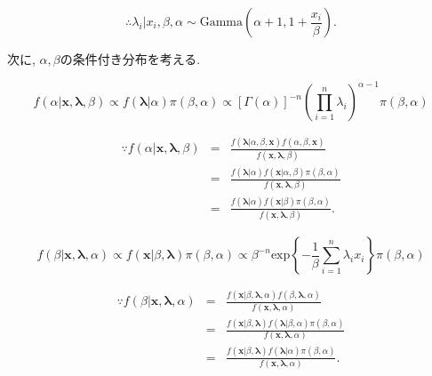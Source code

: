 \documentclass[12pt,dvipdfmx]{beamer}
\begin{document}
\begin{frame}


$$
\therefore
\lambda _{i}|x_{i},\beta ,\alpha 
\sim 
\mbox{Gamma} \left(\alpha +1,1+\frac{x_{i}}{\beta }\right).
$$

次に, $\alpha, \beta$の条件付き分布を考える.

\end{frame}



\begin{frame}


\begin{equation}\label{pdf alpha}
f(\alpha |\bm{x},\bm{\lambda },\beta ) 
\propto
f(\bm{\lambda }|\alpha )\pi (\beta ,\alpha ) 
\propto
[\Gamma(\alpha )]^{-n}
\left(\prod_{i=1}^{n}\lambda_{i}\right)^{\alpha -1}\pi(\beta ,\alpha) 
\end{equation}

\begin{eqnarray*}
\because
f(\alpha |\bm{x},\bm{\lambda },\beta )
&=&
\frac{f(\bm{\lambda }|\alpha ,\beta ,\bm{x})f(\alpha ,\beta ,\bm{x})}
{f(\bm{x},\bm{\lambda },\beta )} \\
&=&
\frac{f(\bm{\lambda }|\alpha )f(\bm{x}|\alpha ,\beta )\pi(\beta ,\alpha )}
{f(\bm{x},\bm{\lambda },\beta )} \\
&=&
\frac{f(\bm{\lambda }|\alpha )f(\bm{x}|\beta )\pi(\beta ,\alpha )}
{f(\bm{x},\bm{\lambda },\beta )}.
\end{eqnarray*}



\end{frame}


\begin{frame}


\begin{equation}\label{pdf beta}
f(\beta |\bm{x},\bm{\lambda },\alpha )
\propto
f(\bm{x}|\beta ,\bm{\lambda })\pi(\beta ,\alpha )
\propto
\beta ^{-n}\mbox{exp}\left\{-\frac{1}{\beta }\sum_{i=1}^{n}\lambda _{i}x_{i}\right\}
\pi(\beta ,\alpha )
\end{equation}

\begin{eqnarray*}
\because
f(\beta |\bm{x},\bm{\lambda },\alpha )
&=&
\frac{f(\bm{x}|\beta ,\bm{\lambda },\alpha )f(\beta ,\bm{\lambda },\alpha )}
{f(\bm{x},\bm{\lambda },\alpha )} \\
&=&
\frac{f(\bm{x}|\beta ,\bm{\lambda })f(\bm{\lambda }|\beta ,\alpha )\pi(\beta ,\alpha )}
{f(\bm{x},\bm{\lambda },\alpha )}\\
&=&
\frac{f(\bm{x}|\beta ,\bm{\lambda })f(\bm{\lambda }|\alpha )\pi(\beta ,\alpha )}
{f(\bm{x},\bm{\lambda },\alpha )}.
\end{eqnarray*}


\end{frame}
\end{document}
